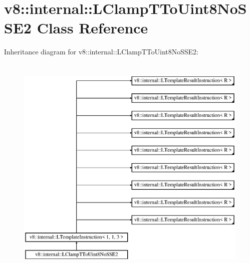\hypertarget{classv8_1_1internal_1_1_l_clamp_t_to_uint8_no_s_s_e2}{}\section{v8\+:\+:internal\+:\+:L\+Clamp\+T\+To\+Uint8\+No\+S\+S\+E2 Class Reference}
\label{classv8_1_1internal_1_1_l_clamp_t_to_uint8_no_s_s_e2}
Inheritance diagram for v8\+:\+:internal\+:\+:L\+Clamp\+T\+To\+Uint8\+No\+S\+S\+E2\+:\begin{figure}[H]
\begin{center}
\leavevmode
\includegraphics[height=11.000000cm]{classv8_1_1internal_1_1_l_clamp_t_to_uint8_no_s_s_e2}
\end{center}
\end{figure}
